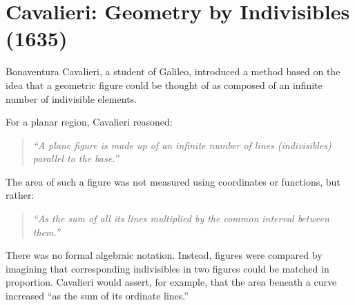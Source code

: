 \section{Cavalieri: Geometry by Indivisibles (1635)}

Bonaventura Cavalieri, a student of Galileo, introduced a method based on the idea that a geometric figure could be thought of as composed of an infinite number of indivisible elements.

\vspace{0.5em}
For a planar region, Cavalieri reasoned:

\begin{quote}
\textit{“A plane figure is made up of an infinite number of lines (indivisibles) parallel to the base.”}
\end{quote}

The area of such a figure was not measured using coordinates or functions, but rather:

\begin{quote}
\textit{“As the sum of all its lines multiplied by the common interval between them.”}
\end{quote}

There was no formal algebraic notation. Instead, figures were compared by imagining that corresponding indivisibles in two figures could be matched in proportion. Cavalieri would assert, for example, that the area beneath a curve increased “as the sum of its ordinate lines.”

\vspace{1em}


